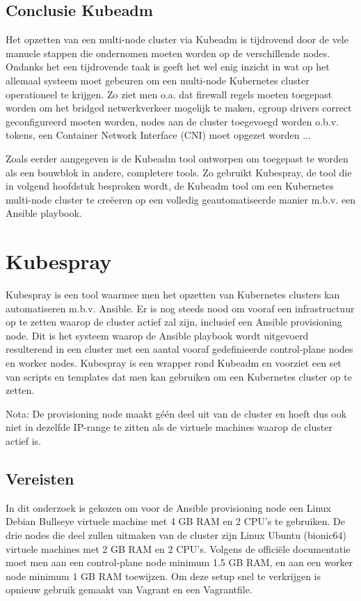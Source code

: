 \subsection{Conclusie Kubeadm}

Het opzetten van een multi-node cluster via Kubeadm is tijdrovend door de vele manuele stappen die ondernomen moeten worden op de verschillende nodes. Ondanks het een tijdrovende taak is geeft het wel enig inzicht in wat op het allemaal systeem moet gebeuren om een multi-node Kubernetes cluster operationeel te krijgen. Zo ziet men o.a. dat firewall regels moeten toegepast worden om het bridged netwerkverkeer mogelijk te maken, cgroup drivers correct geconfigureerd moeten worden, nodes aan de cluster toegevoegd worden o.b.v. tokens, een Container Network Interface (CNI) moet opgezet worden ... 

Zoals eerder aangegeven is de Kubeadm tool ontworpen om toegepast te worden als een bouwblok in andere, completere tools. Zo gebruikt Kubespray, de tool die in volgend hoofdstuk besproken wordt, de Kubeadm tool om een Kubernetes multi-node cluster te creëeren op een volledig geautomatiseerde manier m.b.v. een Ansible playbook.       

\section{Kubespray}

Kubespray is een tool waarmee men het opzetten van Kubernetes clusters kan automatiseren m.b.v. Ansible. Er is nog steeds nood om vooraf een infrastructuur op te zetten waarop de cluster actief zal zijn, inclusief een Ansible provisioning node. Dit is het systeem waarop de Ansible playbook wordt uitgevoerd resulterend in een cluster met een aantal vooraf gedefinieerde control-plane nodes en worker nodes. Kubespray is een wrapper rond Kubeadm en voorziet een set van scripts en templates dat men kan gebruiken om een Kubernetes cluster op te zetten. \autocite{Matykevich2018}

Nota: De provisioning node maakt géén deel uit van de cluster en hoeft dus ook niet in dezelfde IP-range te zitten als de virtuele machines waarop de cluster actief is.

\subsection{Vereisten}  

In dit onderzoek is gekozen om voor de Ansible provisioning node een Linux Debian Bullseye virtuele machine met 4 GB RAM en 2 CPU's te gebruiken. De drie nodes die deel zullen uitmaken van de cluster zijn Linux Ubuntu (bionic64) virtuele machines met 2 GB RAM en 2 CPU's. Volgens de officiële documentatie moet men aan een control-plane node minimum 1.5 GB RAM, en aan een worker node minimum 1 GB RAM toewijzen. Om deze setup snel te verkrijgen is opnieuw gebruik gemaakt van Vagrant en een Vagrantfile. 


